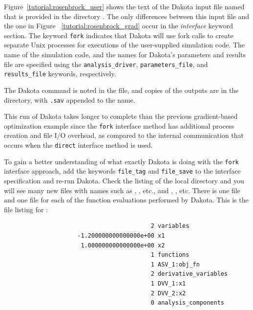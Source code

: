 Figure~\ref{tutorial:rosenbrock_user} shows the text of the Dakota
input file named  that is
provided in the directory .
The only differences between this input file and the one in Figure~
\ref{tutorial:rosenbrock_grad} occur in the \emph{interface} keyword
section. The keyword \texttt{fork} indicates that Dakota will use
fork calls to create separate Unix processes for executions of the
user-supplied simulation code. The name of the simulation code, and
the names for Dakota's parameters and results file are specified using
the \texttt{analysis\_driver}, \texttt{parameters\_file}, and
\texttt{results\_file} keywords, respectively.

The Dakota command is noted in the file, and copies of the outputs are
in the  directory, with
\texttt{.sav} appended to the name.

This run of Dakota takes longer to complete than the previous
gradient-based optimization example since the \texttt{fork}
interface method has additional process creation and file I/O
overhead, as compared to the internal communication that occurs when
the \texttt{direct} interface method is used. 

To gain a better understanding of what exactly Dakota is doing with
the \texttt{fork} interface approach, add the keywords
\texttt{file\_tag} and \texttt{file\_save} to the interface
specification and re-run Dakota. Check the listing of the local
directory and you will see many new files with names such as
, , etc., and
, , etc. There is one
 file and one  file for each
of the function evaluations performed by Dakota. This is the file
listing for :
\begin{small}
\begin{verbatim}
                                          2 variables
                     -1.200000000000000e+00 x1
                      1.000000000000000e+00 x2
                                          1 functions
                                          1 ASV_1:obj_fn
                                          2 derivative_variables
                                          1 DVV_1:x1
                                          2 DVV_2:x2
                                          0 analysis_components
\end{verbatim}
\end{small}

